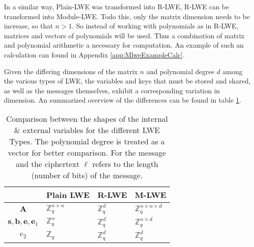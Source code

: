 In a similar way, Plain-LWE was transformed into R-LWE, R-LWE can be transformed into Module-LWE. Todo this, only the matrix dimension needs to be increase, so that $n>1$. So instead of working with polynomials as in R-LWE, matrices and vectors of polynomials will be used. Thus a combination of matrix and polynomial arithmetic a necessary for computation. An example of such an calculation can found in Appendix \ref{app:MlweExampleCalc}.

Given the differing dimensions of the matrix $n$ and polynomial degree $d$ among the various types of LWE, the variables and keys that must be stored and shared, as well as the messages themselves, exhibit a corresponding variation in dimension. An summarized overview of the differences can be found in table \ref{table:LweDiffs}.


\begin{table}[htbp]
  \caption[LWE variables shape comparison]{Comparison between the shapes of the internal \& external variables for the different LWE Types. The polynomial degree is treated as a vector for better comparison. For the message and the ciphertext $\ell$ refers to the length (number of bits) of the message.}
  \label{table:LweDiffs}
  \centering
  \begin{tabular}{|c|l|l|l|}
    \toprule
                                                    & Plain LWE                                        & R-LWE                                                                              & M-LWE                                                                                      \\
    \midrule
    $\textbf{A}$                                    & $\mathbb{Z}^{n\times n}_q$                       & $\mathbb{Z}^d_q$                                                                   & $\mathbb{Z}^{n\times n \times d}_q$                                                        \\
    $\textbf{s},\textbf{b},\textbf{e},\textbf{e}_1$ & $\mathbb{Z}^{n}_q$                               & $\mathbb{Z}^d_q$                                                                   & $\mathbb{Z}^{n\times d}_q$                                                                 \\
    $e_2$                                           & $\mathbb{Z}_q$                                   & $\mathbb{Z}^d_q$                                                                   & $\mathbb{Z}^d_q$                                                                           \\

\end{tabular}
\end{table}
